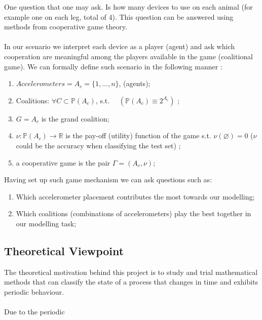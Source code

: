 \documentclass[10pt]{article}
\begin{document}
 One question that one may ask. Is how many devices to use on each animal (for example one on each leg, total of 4). This question can be answered using methods from cooperative game theory. 
\\ \\ 
 In our scenario we interpret each device as a player (agent) and ask which cooperation are meaningful among the players available in the game (coalitional game). We can formally define such scenario in the following manner : 
 
 
 
\begin{enumerate}
\item  $Accelerometers= A_{c} = \{1, ... , n\}$,  (agents);
\item  Coalitions: $\forall C \subset \mathbb{P}(A_{c})$,\; s.t. $\quad  (\mathbb{P}(A_{c}) \equiv 2^{A_{c}})$ ; 
\item $G = A_{c}$ is the grand coalition;
\item $\nu : \mathbb{P}(A_{c}) \rightarrow \mathbb{R}$ is the pay-off (utility) function of the game  s.t. $\nu(\varnothing) =0$ ($\nu$ could be the accuracy when classifying the test set) ; 
\item a cooperative game is the pair $\Gamma = (A_{c}, \nu)$;
\end{enumerate}

\noindent
{ Having set up such game mechanism we can ask questions such as:}


\begin{enumerate}
\item Which accelerometer placement contributes the most towards our modelling;
\item Which coalitions (combinations of accelerometers) play the best together in our modelling task;
\end{enumerate}
 



\subsection{Theoretical Viewpoint}

The theoretical motivation behind this project is to study and trial mathematical methods that can classify the state of a process that changes in time and exhibits periodic behaviour.
\\ \\
Due to the periodic 
\end{document}
